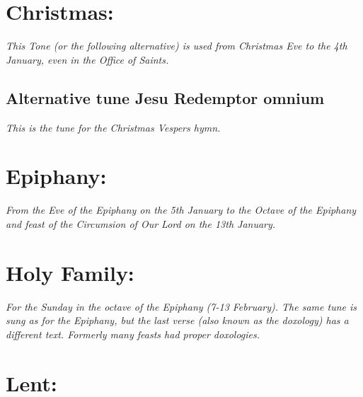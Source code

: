 \documentclass[a5paper,12pt,twoside,openany,oldfontcommands]{memoir}
\newcommand\rubrics[1]{\textit{#1}}
\begin{document}


\section{Christmas:}

\label{TLchristmas}
\rubrics{This Tone (or the following alternative) is used from Christmas Eve to the 4th January, even in the Office of Saints.}


\subsection{Alternative tune Jesu Redemptor omnium}

\rubrics{This is the tune for the Christmas Vespers hymn.}


\goodbreak

\section{Epiphany:}

\rubrics{From the Eve of the Epiphany on the 5th January to the Octave of the Epiphany and feast of the Circumsion of Our Lord on the 13th January.}


\goodbreak


\section{Holy Family:}

\rubrics{For the Sunday in the octave of the Epiphany (7-13 February). The same tune is sung as for the Epiphany, but the last verse (also known as the doxology) has a different text.  Formerly many feasts had proper doxologies.}


\goodbreak



\section{Lent:}
\end{document}
